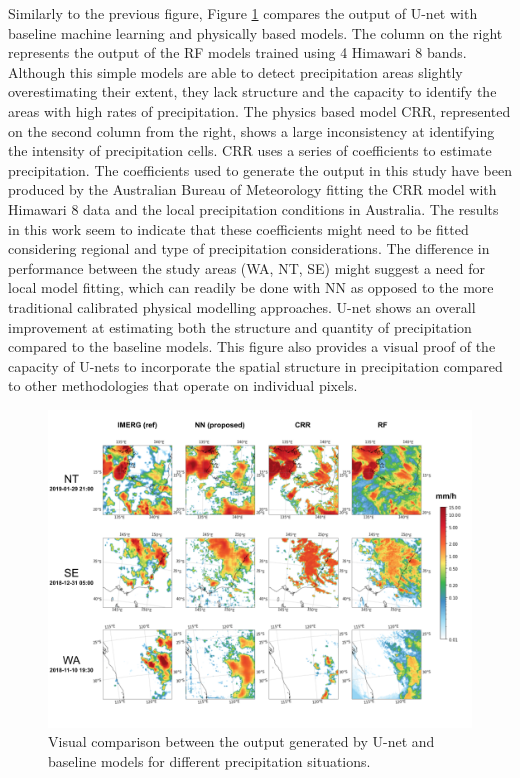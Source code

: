 \documentclass[3p,times]{elsarticle}
\begin{document}
Similarly to the previous figure, Figure \ref{baseline_cmp} compares the output of U-net with baseline machine learning and physically based models. The column on the right represents the output of the RF models trained using 4 Himawari 8 bands. Although this simple models are able to detect precipitation areas slightly overestimating their extent, they lack structure and the capacity to identify the areas with high rates of precipitation. The physics based model CRR, represented on the second column from the right, shows a large inconsistency at identifying the intensity of precipitation cells. CRR uses a series of coefficients to estimate precipitation. The coefficients used to generate the output in this study have been produced by the Australian Bureau of Meteorology fitting the CRR model with Himawari 8 data and the local precipitation conditions in Australia. The results in this work seem to indicate that these coefficients might need to be fitted considering regional and type of precipitation considerations. The difference in performance between the study areas (WA, NT, SE) might suggest a need for local model fitting, which can readily be done with NN as opposed to the more traditional calibrated physical modelling approaches. U-net shows an overall improvement at estimating both the structure and quantity of precipitation compared to the baseline models. This figure also provides a visual proof of the capacity of U-nets to incorporate the spatial structure in precipitation compared to other methodologies that operate on individual pixels.

\begin{figure}%
    \includegraphics[width=14cm]{baseline_cmp.png}
	\caption{Visual comparison between the output generated by U-net and baseline models for different precipitation situations.}%
    \label{baseline_cmp}%
\end{figure}
\end{document}
